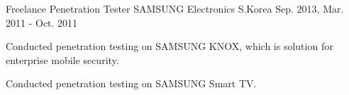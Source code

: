 \begin{cventries}
  \cventry
    {Freelance Penetration Tester} %
    {SAMSUNG Electronics} %
    {S.Korea} %
    {Sep. 2013, Mar. 2011 - Oct. 2011} %
    {
      \begin{cvitems} %
        \item {Conducted penetration testing on SAMSUNG KNOX, which is solution for enterprise mobile security.}
        \item {Conducted penetration testing on SAMSUNG Smart TV.}
      \end{cvitems}
    }

\end{cventries}
